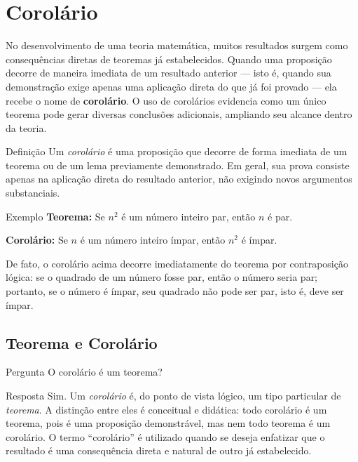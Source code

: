 \documentclass[12pt,a4paper,openright]{book}
\begin{document}
\section{Corolário}

No desenvolvimento de uma teoria matemática, muitos resultados surgem como consequências diretas de teoremas já estabelecidos. Quando uma proposição decorre de maneira imediata de um resultado anterior — isto é, quando sua demonstração exige apenas uma aplicação direta do que já foi provado — ela recebe o nome de \textbf{corolário}. O uso de corolários evidencia como um único teorema pode gerar diversas conclusões adicionais, ampliando seu alcance dentro da teoria.

\begin{block}{Definição}
Um \emph{corolário} é uma proposição que decorre de forma imediata de um teorema ou de um lema previamente demonstrado. Em geral, sua prova consiste apenas na aplicação direta do resultado anterior, não exigindo novos argumentos substanciais.
\end{block}

\begin{block}{Exemplo}
\textbf{Teorema:} Se \(n^2\) é um número inteiro par, então \(n\) é par.

\textbf{Corolário:} Se \(n\) é um número inteiro ímpar, então \(n^2\) é ímpar.
\end{block}

De fato, o corolário acima decorre imediatamente do teorema por contraposição lógica: se o quadrado de um número fosse par, então o número seria par; portanto, se o número é ímpar, seu quadrado não pode ser par, isto é, deve ser ímpar.

\subsection{Teorema e Corolário}

\begin{block}{Pergunta}
O corolário é um teorema?
\end{block}

\begin{block}{Resposta}
Sim. Um \emph{corolário} é, do ponto de vista lógico, um tipo particular de \emph{teorema}. A distinção entre eles é conceitual e didática: todo corolário é um teorema, pois é uma proposição demonstrável, mas nem todo teorema é um corolário. O termo “corolário” é utilizado quando se deseja enfatizar que o resultado é uma consequência direta e natural de outro já estabelecido.
\end{block}
\end{document}
